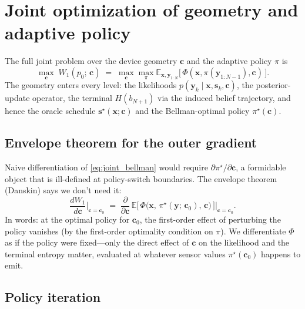 \documentclass[11pt,a4paper]{article}
\newcommand{\E}{\mathbb{E}}
\begin{document}
\section{Joint optimization of geometry and adaptive policy}
\label{sec:joint}

The full joint problem over the device geometry $\bm{c}$ and the adaptive policy $\pi$ is
\begin{equation}
  \boxed{\;
    \max_{\bm{c}} \; W_1(p_0;\, \bm{c}) \;=\; \max_{\bm{c}} \max_{\pi} \E_{\bm{x}, \bm{y}_{1:N}}\!\bigl[\,\Phi(\bm{x}, \pi(\bm{y}_{1:N-1}), \bm{c})\,\bigr].
  \;}
  \label{eq:joint_bellman}
\end{equation}
The geometry enters every level: the likelihoods $p(\bm{y}_k \mid \bm{x}, \bm{s}_k, \bm{c})$, the posterior-update operator, the terminal $H(b_{N+1})$ via the induced belief trajectory, and hence the oracle schedule $\bm{s}^\star(\bm{x}; \bm{c})$ and the Bellman-optimal policy $\pi^\star(\bm{c})$.

\subsection{Envelope theorem for the outer gradient}
\label{subsec:envelope}

Naive differentiation of \eqref{eq:joint_bellman} would require $\partial\pi^\star/\partial\bm{c}$, a formidable object that is ill-defined at policy-switch boundaries.  The envelope theorem (Danskin) says we don't need it:
\begin{equation}
  \boxed{\;
    \frac{d W_1}{d \bm{c}}\bigg|_{\bm{c} = \bm{c}_0}
    \;=\;
    \frac{\partial}{\partial \bm{c}}\, \E\!\bigl[\,\Phi\!\bigl(\bm{x},\, \pi^\star(\bm{y};\, \bm{c}_0),\, \bm{c}\bigr)\,\bigr]\bigg|_{\bm{c} = \bm{c}_0}.
  \;}
  \label{eq:envelope}
\end{equation}
In words: at the optimal policy for $\bm{c}_0$, the first-order effect of perturbing the policy vanishes (by the first-order optimality condition on $\pi$).  We differentiate $\Phi$ as if the policy were fixed---only the direct effect of $\bm{c}$ on the likelihood and the terminal entropy matter, evaluated at whatever sensor values $\pi^\star(\bm{c}_0)$ happens to emit.

\subsection{Policy iteration}
\end{document}
